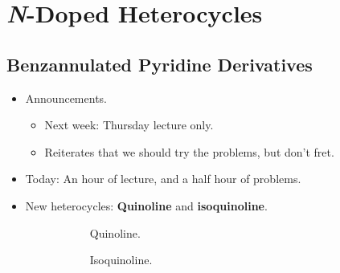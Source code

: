 \documentclass[../notes.tex]{subfiles}
\begin{document}
\chapter{\emph{N}-Doped Heterocycles}
\section{Benzannulated Pyridine Derivatives}
\begin{itemize}
    \item {}Announcements.
    \begin{itemize}
        \item Next week: Thursday lecture only.
        \item Reiterates that we should try the problems, but don't fret.
    \end{itemize}
    \item Today: An hour of lecture, and a half hour of problems.
    \item New heterocycles: \textbf{Quinoline} and \textbf{isoquinoline}.
    \begin{figure}[h!]
        \centering
        \footnotesize
        \begin{subfigure}[b]{0.2\linewidth}
            \centering
            \caption{Quinoline.}
            \label{fig:quinolineDeriva}
        \end{subfigure}
        \begin{subfigure}[b]{0.2\linewidth}
            \centering
            \caption{Isoquinoline.}
            \label{fig:quinolineDerivb}
        \end{subfigure}
        \begin{subfigure}[b]{0.2\linewidth}
            \centering

\end{subfigure}
\end{figure}
\end{itemize}
\end{document}
